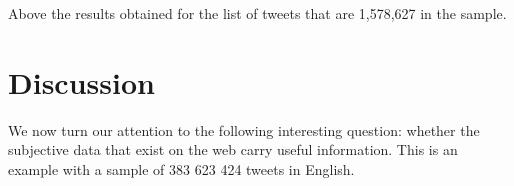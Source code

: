 \documentclass{acmtog} %
\begin{document}
Above the results obtained for the list of tweets that are 1,578,627 in the sample.

\section{Discussion}
\label{sec:discussion}

We now turn our attention to the following interesting question: whether the subjective data that exist on the web carry useful information. This is an example with a sample of 383 623 424 tweets in English.

\begin{table}[H]
\label{tab:cross_tab}
\end{table}
\end{document}

